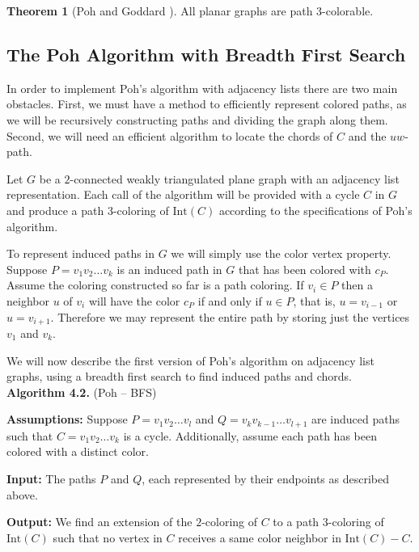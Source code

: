 \documentclass[letterpaper, 12pt]{article}
\theoremstyle{definition}
\theoremstyle{definition}
\theoremstyle{thm}
\newtheorem{theorem}{Theorem}[section]
\theoremstyle{definition}
\begin{document}
\begin{theorem}[Poh \cite{poh} and Goddard \cite{goddard}]
All planar graphs are path $3$-colorable.
\end{theorem}

\subsection{The Poh Algorithm with Breadth First Search}

In order to implement Poh's algorithm with adjacency lists there are two main
obstacles. First, we must have a method to efficiently represent colored paths,
as we will be recursively constructing paths and dividing the graph along them.
Second, we will need an efficient algorithm to locate the chords of $C$ and the
$uw$-path.

Let $G$ be a $2$-connected weakly triangulated plane graph with an adjacency
list representation. Each call of the algorithm will be provided with a cycle
$C$ in $G$ and produce a path $3$-coloring of $\text{Int}(C)$ according to the
specifications of Poh's algorithm.

To represent induced paths in $G$ we will simply use the color vertex property.
Suppose $P=v_1v_2\ldots v_k$ is an induced path in $G$ that has been colored
with $c_P$. Assume the coloring constructed so far is a path coloring. If
$v_i\in P$ then a neighbor $u$ of $v_i$ will have the color $c_P$ if and only if
$u\in P$, that is, $u=v_{i-1}$ or $u=v_{i+1}$. Therefore we may represent the
entire path by storing just the vertices $v_1$ and $v_k$. 

We will now describe the first version of Poh's algorithm on adjacency list
graphs, using a breadth first search to find induced paths and chords.\\

\noindent\textbf{Algorithm 4.2.} (Poh -- BFS)

\noindent\textbf{Assumptions:} Suppose $P=v_1v_2\ldots v_l$ and
$Q=v_kv_{k-1}\ldots v_{l+1}$ are induced
paths such that $C=v_1v_2\ldots v_k$ is a cycle. Additionally, assume each
path has been colored with a distinct color.

\noindent\textbf{Input:} The paths $P$ and $Q$, each represented by their
endpoints as described above.

\noindent\textbf{Output:} We find an extension of the $2$-coloring of $C$ to
a path $3$-coloring of $\text{Int}(C)$ such that
no vertex in $C$ receives a same color neighbor in $\text{Int}(C)-C$.
\end{document}
